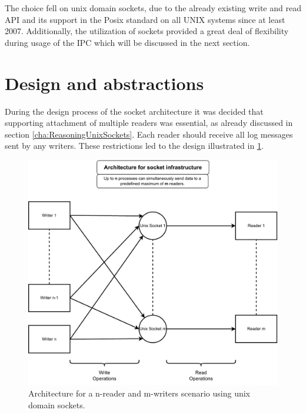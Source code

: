 The choice fell on unix domain sockets, due to the already existing write and read \ac{API} and its support in the Posix standard on all UNIX systems since at least 2007\cite{posix}.
Additionally, the utilization of sockets provided a great deal of flexibility during usage of the \ac{IPC} which will be discussed in the next section.

\section{Design and abstractions}
\label{sec:Design_and_abstractions}
During the design process of the socket architecture it was decided that supporting attachment of multiple readers was essential, as already discussed in section \ref{cha:ReasoningUnixSockets}.
Each reader should receive all log messages sent by any writers.
These restrictions led to the design illustrated in \ref{fig:socket:architecture}.

\begin{figure}[h!]
    \centerline{\includegraphics[width=1.2\textwidth]{images/SocketArchitecture.pdf}}
    \caption[General design of socket architecture]{
        Architecture for a n-reader and m-writers scenario using unix domain sockets.}
	\label{fig:socket:architecture}
\end{figure}


